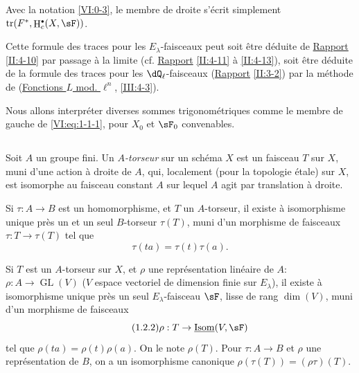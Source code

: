 \documentclass[oneside]{book}
\DeclareMathOperator{\gl}{GL}
\DeclareMathOperator{\h}{H}
\DeclareMathOperator{\tr}{tr}
\theoremstyle{sga-source}
\theoremstyle{sga-source-dash}
\theoremstyle{sga-source-dotdash}
\theoremstyle{sga-source-number-note-dash}
\theoremstyle{sga-source-note-number-dotdash}
\theoremstyle{sga-source-example-dotdash}
\theoremstyle{sga-source-inline-number}
\theoremstyle{sga-source-bare-number}
\theoremstyle{sga-source}
\let\oldbullet\bullet
\renewcommand{\bullet}{\textnormal{\tiny$\oldbullet$}}
\newcommand{\PrintPage}[1]{}\newcommand{\MathPage}[1]{}\newcommand{\PrintCite}[2]{#1}\newcommand{\var}[3]{#2}
\begin{document}
Avec la notation \ref{VI:0-3}, le membre de droite s'écrit simplement 
$\tr(F^\ast,\h_c^\bullet(X,\sF))$. 

Cette formule des traces pour les $E_\lambda$-faisceaux peut soit être 
déduite de \hyperref[II]{Rapport} \ref{II:4-10} par passage à la limite (cf. 
\hyperref[II]{Rapport} \ref{II:4-11} à \ref{II:4-13}), soit être déduite 
de la formule des traces pour les $\dQ_\ell$-faisceaux (\hyperref[II]{Rapport} 
\ref{II:3-2}) par la méthode de (\hyperref[III]{Fonctions $L$ mod. $\ell^n$}, 
\ref{III:4-3}). 

Nous allons interpréter diverses sommes trigonométriques comme le membre de 
gauche de \eqref{VI:eq:1-1-1}, pour $X_0$ et $\sF_0$ convenables. 





\PrintPage{170}
\subsection{}\label{VI:1-2}

Soit $A$ un groupe fini. Un \emph{$A$-torseur} sur un schéma $X$ est un 
faisceau $T$ sur $X$, muni d'une action à droite de $A$, qui, localement 
(pour la topologie étale) sur $X$, est isomorphe au faisceau constant $A$ sur 
lequel $A$ agit par translation à droite. 

Si $\tau:A\to B$ est un homomorphisme, et $T$ un $A$-torseur, il existe à 
isomorphisme unique près un et un seul $B$-torseur $\tau(T)$, muni d'un 
morphisme de faisceaux $\tau:T\to \tau(T)$ tel que 
\begin{equation*}\tag{1.2.1}\label{VI:eq:1-2-1}
  \tau(t a) = \tau(t) \tau(a)\text{.}
\end{equation*}

Si $T$ est un $A$-torseur sur $X$, et $\rho$ une représentation linéaire 
de $A$: $\rho:A\to \gl(V)$ ($V$ espace vectoriel de dimension finie sur 
$E_\lambda$), il existe à isomorphisme unique près un seul 
$E_\lambda$-faisceau $\sF$, lisse de rang $\dim(V)$, muni d'un morphisme de 
faisceaux 
\begin{equation*}\tag{1.2.2}\label{VI:eq:1-2-2}
  \rho:T\to \underline{\operatorname{Isom}}(V,\sF)
\end{equation*}
tel que $\rho(t a) = \rho(t) \rho(a)$. On le note $\rho(T)$. Pour 
$\tau:A\to B$ et $\rho$ une représentation de $B$, on a un isomorphisme 
canonique $\rho(\tau(T)) = (\rho\tau)(T)$. 
\end{document}
